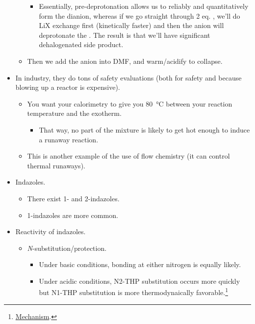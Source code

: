 \documentclass[../notes.tex]{subfiles}
\begin{document}
\begin{itemize}
\begin{itemize}
        \begin{itemize}
            \item Essentially, pre-deprotonation allows us to reliably and quantitatively form the dianion, whereas if we go straight through 2 eq. , we'll do LiX exchange first (kinetically faster) and then the anion will deprotonate the . The result is that we'll have significant dehalogenated side product.
        \end{itemize}
        \item Then we add the anion into DMF, and warm/acidify to collapse.
    \end{itemize}
    \item In industry, they do tons of safety evaluations (both for safety and because blowing up a reactor is expensive).
    \begin{itemize}
        \item You want your calorimetry to give you \SI{80}{\celsius} between your reaction temperature and the exotherm.
        \begin{itemize}
            \item That way, no part of the mixture is likely to get hot enough to induce a runaway reaction.
        \end{itemize}
        \item This is another example of the use of flow chemistry (it can control thermal runaways).
    \end{itemize}
    \item Indazoles.
    \begin{itemize}
        \item There exist 1- and 2-indazoles.
        \item 1-indazoles are more common.
    \end{itemize}
    \item Reactivity of indazoles.
    \begin{itemize}
        \item \emph{N}-substitution/protection.
        \begin{itemize}
            \item Under basic conditions, bonding at either nitrogen is equally likely.
            \item Under acidic conditions, N2-THP substitution occurs more quickly but N1-THP substitution is more thermodynaically favorable.\footnote{\href{https://www.researchgate.net/figure/Scheme-1-Protection-of-an-alcohol-by-Thp-and-its-elimination-mechanism_fig2_314357461}{Mechanism}.}

\end{itemize}
\end{itemize}
\end{itemize}
\end{document}

